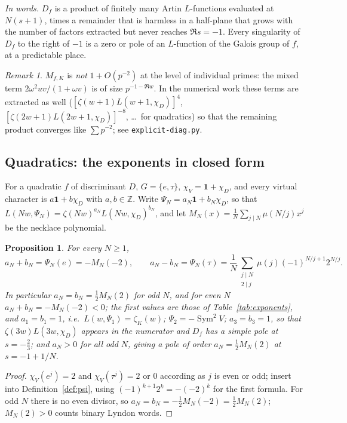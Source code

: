 \documentclass[11pt,a4paper]{article}
\newtheorem{proposition}[theorem]{Proposition}
\theoremstyle{remark}\newtheorem{remark}[theorem]{Remark}
\newcommand{\Z}{\mathbb{Z}}\newcommand{\Q}{\mathbb{Q}}\newcommand{\F}{\mathbb{F}}\newcommand{\C}{\mathbb{C}}
\newcommand{\Sym}{\operatorname{Sym}}\newcommand{\Res}{\operatorname*{Res}}
\begin{document}
\emph{In words.} $D_f$ is a product of finitely many Artin $L$-functions evaluated at $N(s+1)$, times a
remainder that is harmless in a half-plane that grows with the number of factors extracted but never
reaches $\Re s=-1$. Every singularity of $D_f$ to the right of $-1$ is a zero or pole of an $L$-function of the
Galois group of $f$, at a predictable place.

\begin{remark}
$M_{f,K}$ is \emph{not} $1+O(p^{-2})$ at the level of individual primes: the mixed term $2\omega^2uv/(1+\omega v)$
is of size $p^{-1-\Re w}$. In the numerical work these terms are extracted as well
($[\zeta(w+1)L(w+1,\chi_D)]^4$, $[\zeta(2w+1)L(2w+1,\chi_D)]^{-8}$, \dots\ for quadratics) so that the
remaining product converges like $\sum p^{-2}$; see \texttt{explicit-diag.py}.
\end{remark}

\subsection{Quadratics: the exponents in closed form}

For a quadratic $f$ of discriminant $D$, $G=\{e,\tau\}$, $\chi_V=\mathbf 1+\chi_D$, and every virtual
character is $a\mathbf 1+b\chi_D$ with $a,b\in\Z$. Write $\Psi_N=a_N\mathbf 1+b_N\chi_D$, so that
$L(Nw,\Psi_N)=\zeta(Nw)^{a_N}L(Nw,\chi_D)^{b_N}$, and let $M_N(x)=\frac1N\sum_{j\mid N}\mu(N/j)x^j$ be the
necklace polynomial.

\begin{proposition}\label{prop:exponents}
For every $N\ge1$,
\[
a_N+b_N=\Psi_N(e)=-M_N(-2),\qquad
a_N-b_N=\Psi_N(\tau)=\frac1N\sum_{\substack{j\mid N\\ 2\mid j}}\mu(j)(-1)^{N/j+1}2^{N/j}.
\]
In particular $a_N=b_N=\tfrac12M_N(2)$ for odd $N$, and for even $N$
$a_N+b_N=-M_N(-2)<0$; the first values are those of Table~\ref{tab:exponents}, and $a_1=b_1=1$, i.e.\
$L(w,\Psi_1)=\zeta_K(w)$; $\Psi_2=-\Sym^2V$; $a_3=b_3=1$, so that $\zeta(3w)L(3w,\chi_D)$ appears in the
numerator and $D_f$ has a simple pole at $s=-\tfrac23$; and $a_N>0$ for all odd $N$, giving a pole of order
$a_N=\tfrac12M_N(2)$ at $s=-1+1/N$.
\end{proposition}
\begin{proof}
$\chi_V(e^j)=2$ and $\chi_V(\tau^j)=2$ or $0$ according as $j$ is even or odd; insert into
Definition~\ref{def:psi}, using $(-1)^{k+1}2^k=-(-2)^k$ for the first formula. For odd $N$ there is no even
divisor, so $a_N=b_N=-\tfrac12M_N(-2)=\tfrac12M_N(2)$; $M_N(2)>0$ counts binary Lyndon words.
\end{proof}
\end{document}
